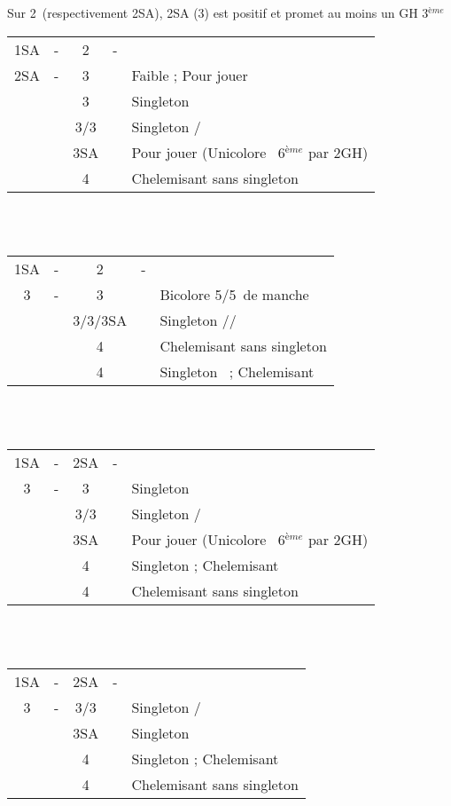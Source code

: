 \documentclass[a4paper, oneside, 11pt]{report}
\begin{document}
\newpage
		Sur 2\pique\ (respectivement 2SA), 2SA (3\trefle) est positif et promet au moins un GH 3$^{ème}$\\

		\begin{tabular}{cccc|l}
		1SA & - & 2\pique & - &\\
		2SA & - & 3\trefle && Faible ; Pour jouer\\
		&& 3\carreau && Singleton \carreau\\
		&& 3\coeur/3\pique && Singleton \pique/\coeur\\
		&& 3SA && Pour jouer (Unicolore \trefle\ 6$^{ème}$ par 2GH)\\
		&& 4\trefle && Chelemisant sans singleton\\
		\end{tabular}\\\\

		\begin{tabular}{cccc|l}
		1SA & - & 2\pique & - &\\
		3\trefle & - & 3\carreau && Bicolore 5\trefle/5\carreau\ de manche\\
		&& 3\coeur/3\pique/3SA && Singleton \pique/\coeur/\carreau\\
		&& 4\trefle && Chelemisant sans singleton\\
		&& 4\carreau && Singleton \carreau\ ; Chelemisant\\
		\end{tabular}\\\\
		
		\begin{tabular}{cccc|l}
		1SA & - & 2SA & - &\\
		3\trefle & - &  3\carreau && Singleton \trefle\\
		&& 3\coeur/3\pique && Singleton \pique/\coeur\\
		&& 3SA && Pour jouer (Unicolore \carreau\ 6$^{ème}$ par 2GH)\\
		&& 4\trefle && Singleton \trefle ; Chelemisant\\
		&& 4\carreau && Chelemisant sans singleton\\
		\end{tabular}\\\\

		\begin{tabular}{cccc|l}
		1SA & - & 2SA & - &\\
		3\carreau & - & 3\coeur/3\pique && Singleton \pique/\coeur\\
		&& 3SA && Singleton \trefle\\
		&& 4\trefle && Singleton \trefle ; Chelemisant\\
		&& 4\carreau && Chelemisant sans singleton\\
		\end{tabular}\\\\
\end{document}
